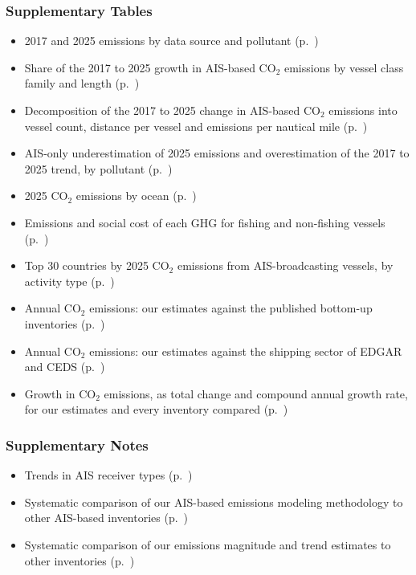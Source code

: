 \subsubsection*{Supplementary Tables}
\begin{itemize}\setlength{\itemsep}{0pt}
    \item[1.] 2017 and 2025 emissions by data source and pollutant (p.~\pageref{tab:total_percent_change_by_fleet})
    \item[2.] Share of the 2017 to 2025 growth in AIS-based CO$_{2}$ emissions by vessel class family and length (p.~\pageref{tab:growth_share_by_family_length})
    \item[3.] Decomposition of the 2017 to 2025 change in AIS-based CO$_{2}$ emissions into vessel count, distance per vessel and emissions per nautical mile (p.~\pageref{tab:growth_decomposition_by_family_length})
    \item[4.] AIS-only underestimation of 2025 emissions and overestimation of the 2017 to 2025 trend, by pollutant (p.~\pageref{tab:pollutant_ais_underestimation_overestimation_summary})
    \item[5.] 2025 CO$_{2}$ emissions by ocean (p.~\pageref{tab:emissions_by_ocean_summary_tbl})
    \item[6.] Emissions and social cost of each GHG for fishing and non-fishing vessels (p.~\pageref{tab:social_cost_summary_tbl})
    \item[7.] Top 30 countries by 2025 CO$_{2}$ emissions from AIS-broadcasting vessels, by activity type (p.~\pageref{tab:top_countries_by_activity_type})
    \item[8.] Annual CO$_{2}$ emissions: our estimates against the published bottom-up inventories (p.~\pageref{tab:inventory_comparison_all_sources})
    \item[9.] Annual CO$_{2}$ emissions: our estimates against the shipping sector of EDGAR and CEDS (p.~\pageref{tab:multisector_shipping_comparison})
    \item[10.] Growth in CO$_{2}$ emissions, as total change and compound annual growth rate, for our estimates and every inventory compared (p.~\pageref{tab:inventory_growth_comparison})
\end{itemize}

\subsubsection*{Supplementary Notes}
\begin{itemize}\setlength{\itemsep}{0pt}
    \item[1.] Trends in AIS receiver types (p.~\pageref{sec:ais-receiver-types})
    \item[2.] Systematic comparison of our AIS-based emissions modeling methodology to other AIS-based inventories (p.~\pageref{sec:methods-comparison})
    \item[3.] Systematic comparison of our emissions magnitude and trend estimates to other inventories (p.~\pageref{sec:inventory-comparison})
\end{itemize}

